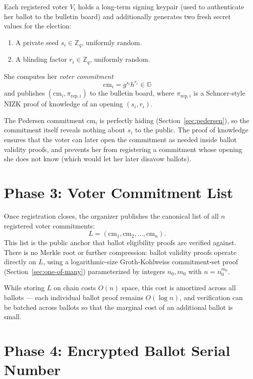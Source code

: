 \documentclass[12pt,a4paper,oneside]{report}
\begin{document}
Each registered voter $V_i$ holds a long-term signing keypair (used to 
authenticate her ballot to the bulletin board) and additionally generates 
two fresh secret values for the election:

\begin{enumerate}
    \item A private seed $s_i \in \mathbb{Z}_q$, uniformly random.
    \item A blinding factor $r_i \in \mathbb{Z}_q$, uniformly random.
\end{enumerate}

She computes her \textit{voter commitment}
\[
    \text{cm}_i = g^{s_i} h^{r_i} \in \mathbb{G}
\]
and publishes $(\text{cm}_i, \pi_{\text{rep}, i})$ to the bulletin board, 
where $\pi_{\text{rep}, i}$ is a Schnorr-style NIZK proof of knowledge 
of an opening $(s_i, r_i)$.

The Pedersen commitment $\text{cm}_i$ is perfectly hiding 
(Section~\ref{sec:pedersen}), so the commitment itself reveals nothing 
about $s_i$ to the public. The proof of knowledge ensures that the voter 
can later open the commitment as needed inside ballot validity proofs, 
and prevents her from registering a commitment whose opening she does 
not know (which would let her later disavow ballots).

\section{Phase 3: Voter Commitment List}
\label{sec:phase-3-list}

Once registration closes, the organizer publishes the canonical list of 
all $n$ registered voter commitments:
\[
    L = (\text{cm}_1, \text{cm}_2, \ldots, \text{cm}_n).
\]
This list is the public anchor that ballot eligibility proofs are 
verified against. There is no Merkle root or further compression: 
ballot validity proofs operate directly on $L$, using a logarithmic-size 
Groth-Kohlweiss commitment-set proof (Section~\ref{sec:one-of-many}) 
parameterized by integers $n_0, m_0$ with $n = n_0^{m_0}$.

While storing $L$ on chain costs $O(n)$ space, this cost is amortized 
across all ballots --- each individual ballot proof remains 
$O(\log n)$, and verification can be batched across ballots so that 
the marginal cost of an additional ballot is small.

\section{Phase 4: Encrypted Ballot Serial Number}
\label{sec:phase-4-serial}
\end{document}
